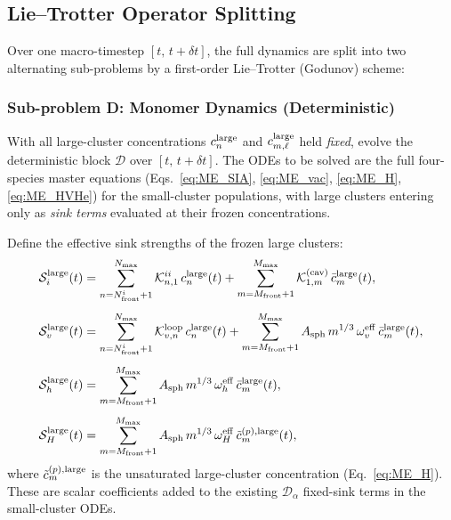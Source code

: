 \documentclass[pdflatex,sn-basic]{sn-jnl} %
\begin{document}
\subsection{Lie--Trotter Operator Splitting}
\label{sec:hybrid_splitting}

Over one macro-timestep $[t,\, t + \delta t]$, the full dynamics
are split into two alternating sub-problems by a first-order
Lie--Trotter (Godunov) scheme:

\subsubsection{Sub-problem D: Monomer Dynamics (Deterministic)}
\label{sec:subD}

With all large-cluster concentrations $c_n^{\rm large}$ and
$c_{m,\ell}^{\rm large}$ held \emph{fixed}, evolve the deterministic
block $\mathcal{D}$ over $[t,\, t+\delta t]$.  The ODEs to be solved
are the full four-species master equations
(Eqs.~\ref{eq:ME_SIA}, \ref{eq:ME_vac}, \ref{eq:ME_H},
\ref{eq:ME_HVHe}) for the small-cluster populations, with large
clusters entering only as \emph{sink terms} evaluated at their
frozen concentrations.

Define the effective sink strengths of the frozen large clusters:
\begin{align}
    \mathcal{S}_i^{\rm large}(t)
    &= \sum_{n=N_{\rm front}^i+1}^{N_{\max}}
       \mathcal{K}_{n,1}^{ii}\,c_n^{\rm large}(t)
     + \sum_{m=M_{\rm front}+1}^{M_{\max}}
       \mathcal{K}_{1,m}^{(\rm cav)}\,\bar{c}_m^{\rm large}(t),
    \label{eq:Si_large}\\[4pt]
    \mathcal{S}_v^{\rm large}(t)
    &= \sum_{n=N_{\rm front}^i+1}^{N_{\max}}
       \mathcal{K}_{v,n}^{\rm loop}\,c_n^{\rm large}(t)
     + \sum_{m=M_{\rm front}+1}^{M_{\max}}
       A_{\rm sph}\,m^{1/3}\,\omega_v^{\rm eff}\,
       \bar{c}_m^{\rm large}(t),
    \label{eq:Sv_large}\\[4pt]
    \mathcal{S}_h^{\rm large}(t)
    &= \sum_{m=M_{\rm front}+1}^{M_{\max}}
       A_{\rm sph}\,m^{1/3}\,\omega_h^{\rm eff}\,
       \bar{c}_m^{\rm large}(t),
    \label{eq:Sh_large}\\[4pt]
    \mathcal{S}_H^{\rm large}(t)
    &= \sum_{m=M_{\rm front}+1}^{M_{\max}}
       A_{\rm sph}\,m^{1/3}\,\omega_H^{\rm eff}\,
       \tilde{c}_m^{(p),\rm large}(t),
    \label{eq:SH_large}
\end{align}
where $\tilde{c}_m^{(p),\rm large}$ is the unsaturated large-cluster
concentration (Eq.~\ref{eq:ME_H}).  These are scalar coefficients
added to the existing $\mathcal{D}_\alpha$ fixed-sink terms in the
small-cluster ODEs.
\end{document}
